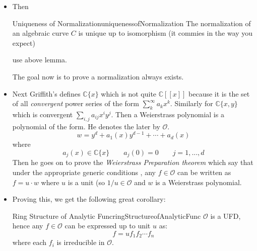 \documentclass{book}
\newcommand{\C}{{\mathbb{C}}}
\newcommand{\CO}{{\mathcal{O}}}
\begin{document}
\begin{itemize}
        \begin{Proof}
          Prove it is biholomorphic in every neighbourhood.
        \end{Proof}
      \item Then
        \begin{thm}{Uniqueness of Normalization}{uniquenessofNormalization}
          The normalization of an algebraic curve $C$ is unique up to isomorphism (it commies in the way you
          expect)
        \end{thm}

        \begin{Proof}
          use above lemma.
        \end{Proof}
        The goal now is to prove a normalization always exists.
      \item Next Griffith's defines $\C\{x\}$ which is not quite $\C[[x]]$ because it is the set of all
        \emph{convergent} power series of the form $\sum_k^\infty a_kx^k$. Similarly for $\C\{x,y\}$ which is
        convergent $\sum_{i,j} a_{ij}x^iy^j$. Then a Weierstrass polynomial is a polynomial of the form. He
        denotes the later by $\CO$.
        \[
          w = y^d + a_1(x)y^{d-1} + \cdots + a_d(x)
        \]
        where
        \[
          a_j(x) \in \C\{x\}\qquad a_j(0) = 0 \qquad j = 1,...,d
        \]
        Then he goes on to prove the \emph{Weierstrass Preparation theorem} which say that under the
        appropriate generic conditions , any $f \in \CO$ can be written as $f = u\cdot w$ where $u$ is a unit
        (so $1/u \in \CO$ and $w$ is a Weierstrass polynomial.

      \item Proving this, we get the following great corollary:
        \begin{cor}{Ring Structure of Analytic Func}{ringStructureofAnalyticFunc}
          $\CO$ is a UFD, hence any $f \in \CO$ can be expressed up to unit $u$ as:
          \[
            f = uf_1f_2\cdots f_n
          \]
          where each $f_i$ is irreducible in $\CO$.
        \end{cor}


\end{itemize}
\end{document}

